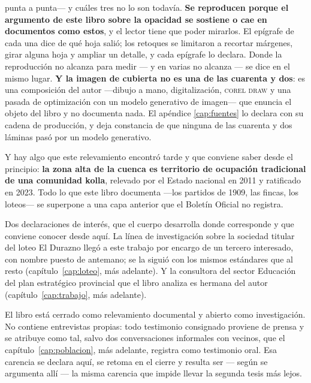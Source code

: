 punta a punta--- y cuáles tres no lo son todavía. \textbf{Se reproducen porque el argumento de
este libro sobre la opacidad se sostiene o cae en documentos como estos}, y el lector tiene
que poder mirarlos. El epígrafe de cada una dice de qué hoja salió; los retoques se limitaron a recortar márgenes, girar alguna hoja y ampliar un detalle, y cada epígrafe lo declara. Donde la reproducción no alcanza para medir --- y en
varias no alcanza --- se dice en el mismo lugar. \textbf{Y la imagen de cubierta no es una de las cuarenta y dos}: es una composición del autor ---dibujo a mano, digitalización, \textsc{corel draw} y una pasada de optimización con un modelo generativo de imagen--- que enuncia el objeto del libro y no documenta nada. El apéndice \ref{cap:fuentes} lo declara con su cadena de producción, y deja constancia de que ninguna de las cuarenta y dos láminas pasó por un modelo generativo.

Y hay algo que este relevamiento encontró tarde y que conviene saber desde el principio: \textbf{la zona alta de la cuenca es territorio de ocupación tradicional de una comunidad kolla}, relevado por el Estado nacional en 2011 y ratificado en 2023. Todo lo que este libro documenta ---los partidos de 1909, las fincas, los loteos--- se superpone a una capa anterior que el Boletín Oficial no registra.

Dos declaraciones de interés, que el cuerpo desarrolla donde corresponde y que conviene conocer desde aquí. La línea de investigación sobre la sociedad titular del loteo El Durazno llegó a este trabajo por encargo de un tercero interesado, con nombre puesto de antemano; se la siguió con los mismos estándares que al resto (capítulo~\ref{cap:loteo}, más adelante). Y la consultora del sector Educación del plan estratégico provincial que el libro analiza es hermana del autor (capítulo~\ref{cap:trabajo}, más adelante).\par\medskip El libro está cerrado como relevamiento documental y abierto como investigación. No contiene entrevistas propias: todo testimonio consignado proviene de prensa y se atribuye como tal, salvo dos conversaciones informales con vecinos, que el capítulo~\ref{cap:poblacion}, más adelante, registra como testimonio oral. Esa carencia se declara aquí, se retoma en el cierre y resulta ser --- según se argumenta allí --- la misma carencia que impide llevar la segunda tesis más lejos.
